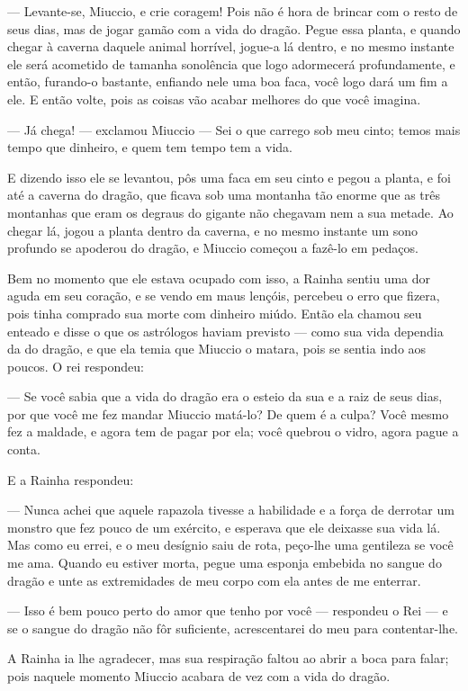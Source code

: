 — Levante-se, Miuccio, e crie coragem! Pois não é hora de brincar com
o resto de seus dias, mas de jogar gamão com a vida do dragão. Pegue
essa planta, e quando chegar à caverna daquele animal horrível,
jogue-a lá dentro, e no mesmo instante ele será acometido de tamanha
sonolência que logo adormecerá profundamente, e então, furando-o
bastante, enfiando nele uma boa faca, você logo dará um fim a ele. E
então volte, pois as coisas vão acabar melhores do que você imagina.

— Já chega! — exclamou Miuccio — Sei o que carrego sob meu cinto;
temos mais tempo que dinheiro, e quem tem tempo tem a vida. 

E dizendo isso ele se levantou, pôs uma faca em seu cinto e pegou a
planta, e foi até a caverna do dragão, que ficava sob uma montanha
tão enorme que as três montanhas que eram os degraus do gigante não
chegavam nem a sua metade. Ao chegar lá, jogou a planta dentro da
caverna, e no mesmo instante um sono profundo se apoderou do dragão,
e Miuccio começou a fazê-lo em pedaços. 

Bem no momento que ele estava ocupado com isso, a Rainha sentiu uma
dor aguda em seu coração, e se vendo em maus lençóis, percebeu o erro
que fizera, pois tinha comprado sua morte com dinheiro miúdo. Então
ela chamou seu enteado e disse o que os astrólogos haviam previsto —
como sua vida dependia da do dragão, e que ela temia que Miuccio o
matara, pois se sentia indo aos poucos. O rei respondeu:

— Se você sabia que a vida do dragão era o esteio da sua e a raiz de
seus dias, por que você me fez mandar Miuccio matá-lo? De quem é a
culpa? Você mesmo fez a maldade, e agora tem de pagar por ela; você
quebrou o vidro, agora pague a conta.

E a Rainha respondeu:

— Nunca achei que aquele rapazola tivesse a habilidade e a força de
derrotar um monstro que fez pouco de um exército, e esperava que ele
deixasse sua vida lá. Mas como eu errei, e o meu desígnio saiu de
rota, peço-lhe uma gentileza se você me ama. Quando eu estiver morta,
pegue uma esponja embebida no sangue do dragão e unte as extremidades
de meu corpo com ela antes de me enterrar. 

— Isso é bem pouco perto do amor que tenho por você — respondeu o Rei
— e se o sangue do dragão não fôr suficiente, acrescentarei do meu
para contentar-lhe. 

A Rainha ia lhe agradecer, mas sua respiração faltou ao abrir a boca
para falar; pois naquele momento Miuccio acabara de vez com a vida do
dragão. 

